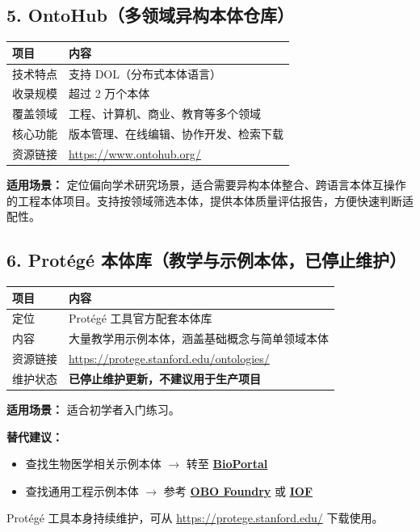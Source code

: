 \subsection{5. OntoHub（多领域异构本体仓库）}

\begin{center}
\begin{tabular}{@{}ll@{}}
\toprule
\textbf{项目} & \textbf{内容} \\
\midrule
技术特点 & 支持 DOL（分布式本体语言） \\
收录规模 & 超过 2 万个本体 \\
覆盖领域 & 工程、计算机、商业、教育等多个领域 \\
核心功能 & 版本管理、在线编辑、协作开发、检索下载 \\
资源链接 & \url{https://www.ontohub.org/} \\
\bottomrule
\end{tabular}
\end{center}
\color{black}

\textbf{适用场景：} 定位偏向学术研究场景，适合需要异构本体整合、跨语言本体互操作的工程本体项目。支持按领域筛选本体，提供本体质量评估报告，方便快速判断适配性。


\subsection{6. Protégé 本体库（教学与示例本体，已停止维护）}

\begin{center}
\begin{tabular}{@{}ll@{}}
\toprule
\textbf{项目} & \textbf{内容} \\
\midrule
定位 & Protégé 工具官方配套本体库 \\
内容 & 大量教学用示例本体，涵盖基础概念与简单领域本体 \\
资源链接 & \url{https://protege.stanford.edu/ontologies/} \\
维护状态 &  \textbf{已停止维护更新，不建议用于生产项目} \\
\bottomrule
\end{tabular}
\end{center}
\color{black}

\textbf{适用场景：} 适合初学者入门练习。

\begin{noteblock}
\textbf{替代建议：}
\begin{itemize}
\item 查找生物医学相关示例本体 \(\rightarrow\) 转至 \textbf{\href{https://bioportal.bioontology.org/}{BioPortal}}
\item 查找通用工程示例本体 \(\rightarrow\) 参考 \textbf{\href{https://obofoundry.org/}{OBO Foundry}} 或 \textbf{\href{https://www.industrialontologies.org/}{IOF}}
\end{itemize}

Protégé 工具本身持续维护，可从 \url{https://protege.stanford.edu/} 下载使用。
\end{noteblock}


